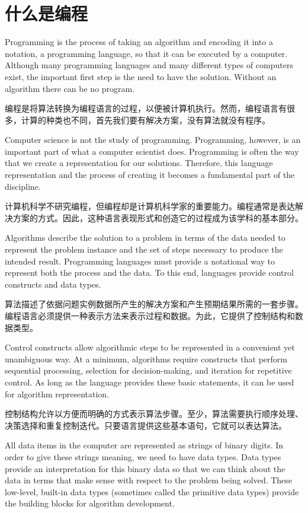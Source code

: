 \section{什么是编程}
Programming is the process of taking an algorithm and encoding it into a notation, a programming language, so that it can be executed by a computer. Although many programming languages and many different types of computers exist, the important first step is the need to have the solution. Without an algorithm there can be no program.

编程是将算法转换为编程语言的过程，以便被计算机执行。然而，编程语言有很多，计算的种类也不同，首先我们要有解决方案，没有算法就没有程序。

Computer science is not the study of programming. Programming, however, is an important part of what a computer scientist does. Programming is often the way that we create a representation for our solutions. Therefore, this language representation and the process of creating it becomes a fundamental part of the discipline.

计算机科学不研究编程，但编程却是计算机科学家的重要能力。编程通常是表达解决方案的方式。因此，这种语言表现形式和创造它的过程成为该学科的基本部分。

Algorithms describe the solution to a problem in terms of the data needed to represent the problem instance and the set of steps necessary to produce the intended result. Programming languages must provide a notational way to represent both the process and the data. To this end, languages provide control constructs and data types.

算法描述了依据问题实例数据所产生的解决方案和产生预期结果所需的一套步骤。编程语言必须提供一种表示方法来表示过程和数据。为此，它提供了控制结构和数据类型。

Control constructs allow algorithmic steps to be represented in a convenient yet unambiguous way. At a minimum, algorithms require constructs that perform sequential processing, selection for decision-making, and iteration for repetitive control. As long as the language provides these basic statements, it can be used for algorithm representation.

控制结构允许以方便而明确的方式表示算法步骤。至少，算法需要执行顺序处理、决策选择和重复控制迭代。只要语言提供这些基本语句，它就可以表达算法。

All data items in the computer are represented as strings of binary digits. In order to give these strings meaning, we need to have data types. Data types provide an interpretation for this binary data so that we can think about the data in terms that make sense with respect to the problem being solved. These low-level, built-in data types (sometimes called the primitive data types) provide the building blocks for algorithm development.

